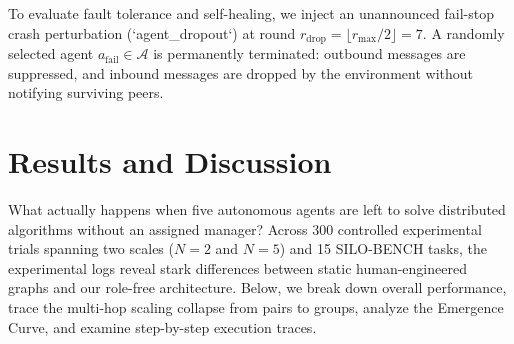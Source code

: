 \documentclass{ieeeaccess}
\begin{document}
To evaluate fault tolerance and self-healing, we inject an unannounced fail-stop crash perturbation (`agent_dropout`) at round $r_{\text{drop}} = \lfloor r_{\max} / 2 \rfloor = 7$. A randomly selected agent $a_{\text{fail}} \in \mathcal{A}$ is permanently terminated: outbound messages are suppressed, and inbound messages are dropped by the environment without notifying surviving peers.


\section{Results and Discussion}
\label{sec:results}

What actually happens when five autonomous agents are left to solve distributed algorithms without an assigned manager? Across 300 controlled experimental trials spanning two scales ($N=2$ and $N=5$) and 15 SILO-BENCH tasks, the experimental logs reveal stark differences between static human-engineered graphs and our role-free architecture. Below, we break down overall performance, trace the multi-hop scaling collapse from pairs to groups, analyze the Emergence Curve, and examine step-by-step execution traces.

\begin{table}[t]
\centering
\caption{Master Head-to-Head Architectural Comparison Averaged Across Both Scales ($N=2$ and $N=5$, 300 Total Controlled Runs). Accuracy, Token Consumption, Dropout Resilience, and Structural Specialization Under Qwen 3.8 27B.}
\label{tab:master_comparison}
\end{table}
\end{document}
